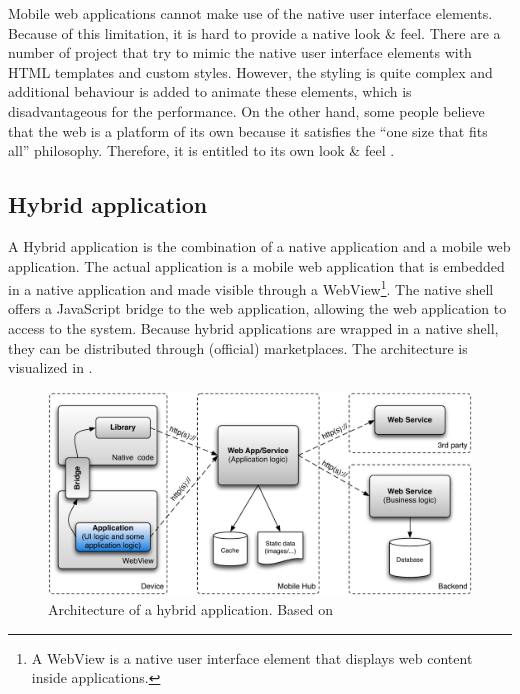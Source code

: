 Mobile web applications cannot make use of the native user interface elements. Because of this limitation, it is hard to provide a native look \& feel. There are a number of project that try to mimic the native user interface elements with HTML templates and custom styles. However, the styling is quite complex and additional behaviour is added to animate these elements, which is disadvantageous for the performance. On the other hand, some people believe that the web is a platform of its own because it satisfies the ``one size that fits all'' philosophy. Therefore, it is entitled to its own look \& feel \cite{Mahemoff:2011}.


\subsection{Hybrid application}

A Hybrid application is the combination of a native application and a mobile web application. The actual application is a mobile web application that is embedded in a native application and made visible through a WebView\footnote{A WebView is a native user interface element that displays web content inside applications.}. The native shell offers a JavaScript bridge to the web application, allowing the web application to access to the system. Because hybrid applications are wrapped in a native shell, they can be distributed through (official) marketplaces. The architecture is visualized in .

\begin{figure}[h]
    \begin{center}
        \includegraphics[width=\textwidth]{figs/hybrid.pdf}
        \caption{Architecture of a hybrid application. Based on \cite{Friese}}
        \label{fig:hybrid}
    \end{center}
\end{figure}

